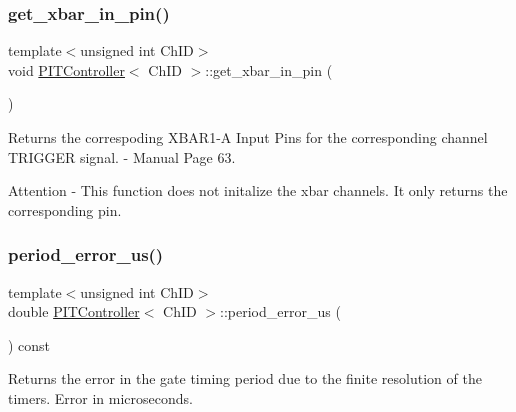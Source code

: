 \subsubsection{\texorpdfstring{get\+\_\+xbar\+\_\+in\+\_\+pin()}{get\_xbar\_in\_pin()}}
{\footnotesize\ttfamily template$<$unsigned int Ch\+ID$>$ \\
void \hyperlink{classPITController}{P\+I\+T\+Controller}$<$ Ch\+ID $>$\+::get\+\_\+xbar\+\_\+in\+\_\+pin (\begin{DoxyParamCaption}{ }\end{DoxyParamCaption})\hspace{0.3cm}{\ttfamily [inline]}}



Returns the correspoding X\+B\+A\+R1-\/A Input Pins for the corresponding channel T\+R\+I\+G\+G\+ER signal.  -\/ Manual Page 63. 

\begin{DoxyAttention}{Attention}
-\/ This function does not initalize the xbar channels. It only returns the corresponding pin. 
\end{DoxyAttention}
\mbox{\label{group__Controls_ga3fedb5ff5a44b664e8132f4e2836b155}} 
\subsubsection{\texorpdfstring{period\+\_\+error\+\_\+us()}{period\_error\_us()}}
{\footnotesize\ttfamily template$<$unsigned int Ch\+ID$>$ \\
double \hyperlink{classPITController}{P\+I\+T\+Controller}$<$ Ch\+ID $>$\+::period\+\_\+error\+\_\+us (\begin{DoxyParamCaption}{ }\end{DoxyParamCaption}) const\hspace{0.3cm}{\ttfamily [inline]}}



Returns the error in the gate timing period due to the finite resolution of the timers.  Error in microseconds. 

